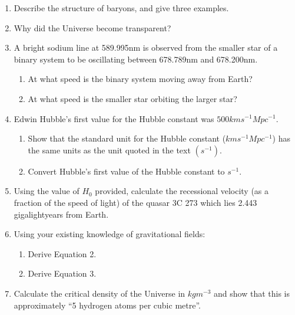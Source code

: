 \documentclass{tufte-handout}
\begin{document}
\begin{fullwidth}
\begin{enumerate}
\item Describe the structure of baryons, and give three examples. 
\item Why did the Universe become transparent? 
\item A bright sodium line at 589.995nm is observed from the smaller star of a binary system to be oscillating between 678.789nm and 678.200nm. 
\begin{enumerate}
\item At what speed is the binary system moving away from Earth?
\item At what speed is the smaller star orbiting the larger star?
\end{enumerate}
\item Edwin Hubble's first value for the Hubble constant was $500kms^{-1}Mpc^{-1}$.
\begin{enumerate}
\item Show that the standard unit for the Hubble constant ($kms^{-1} Mpc^{-1}$) has the same units as the unit quoted in the text $(s^{-1})$. 
\item Convert Hubble's first value of the Hubble constant to $s^{-1}$. 
\end{enumerate}
\item Using the value of $H_{0}$ provided, calculate the recessional velocity (as a fraction of the speed of light) of the quasar 3C 273 which lies 2.443 gigalightyears from Earth. 
\item Using your existing knowledge of gravitational fields: 
\begin{enumerate}
\item Derive Equation 2. 
\item Derive Equation 3.
\end{enumerate}
\item Calculate the critical density of the Universe in $kgm^{-3}$ and show that this is approximately ``5 hydrogen atoms per cubic metre''.

\end{enumerate}


\end{fullwidth}
\end{document}
